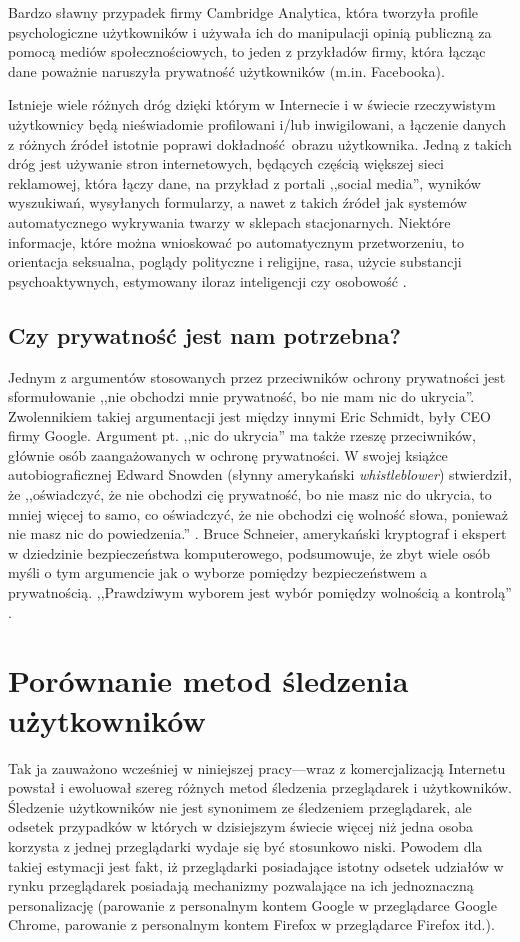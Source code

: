 Bardzo sławny przypadek firmy Cambridge Analytica, która tworzyła profile
psychologiczne użytkowników i używała ich do manipulacji opinią publiczną za
pomocą mediów społecznościowych, to jeden z przykładów firmy, która łącząc dane
poważnie naruszyła prywatność użytkowników (m.in. Facebooka).

Istnieje wiele różnych dróg dzięki którym w Internecie i w świecie rzeczywistym
użytkownicy będą nieświadomie profilowani i/lub inwigilowani, a łączenie danych
z różnych źródeł istotnie poprawi dokładność obrazu użytkownika. Jedną z takich
dróg jest używanie stron internetowych, będących częścią większej sieci
reklamowej, która łączy dane, na przykład z portali ,,social media'', wyników
wyszukiwań, wysyłanych formularzy, a nawet z takich źródeł jak systemów
automatycznego wykrywania twarzy w sklepach stacjonarnych. Niektóre informacje,
które można wnioskować po automatycznym przetworzeniu, to orientacja seksualna,
poglądy polityczne i religijne, rasa, użycie substancji psychoaktywnych,
estymowany iloraz inteligencji czy osobowość \cite{kosinski2013private}.

\subsection{Czy prywatność jest nam potrzebna?}
Jednym z argumentów stosowanych przez przeciwników ochrony prywatności jest
sformułowanie ,,nie obchodzi mnie prywatność, bo nie mam nic do ukrycia''.
Zwolennikiem takiej argumentacji jest między innymi Eric Schmidt, były CEO firmy
Google. Argument pt. ,,nic do ukrycia'' ma także rzeszę przeciwników, głównie
osób zaangażowanych w ochronę prywatności. W swojej książce autobiograficznej
Edward Snowden (słynny amerykański \emph{whistleblower}) stwierdził, że
,,oświadczyć, że nie obchodzi cię prywatność, bo nie masz nic do ukrycia, to
mniej więcej to samo, co oświadczyć, że nie obchodzi cię wolność słowa, ponieważ
nie masz nic do powiedzenia.'' \cite{snowden2019pamiec}. Bruce Schneier,
amerykański kryptograf i ekspert w dziedzinie bezpieczeństwa komputerowego,
podsumowuje, że zbyt wiele osób myśli o tym argumencie jak o wyborze pomiędzy
bezpieczeństwem a prywatnością. ,,Prawdziwym wyborem jest wybór pomiędzy
wolnością a kontrolą'' \cite{schneier2006eternal}.

\section{Porównanie metod śledzenia użytkowników}
Tak ja zauważono wcześniej w niniejszej pracy---wraz z komercjalizacją Internetu
powstał i ewoluował szereg różnych metod śledzenia przeglądarek i użytkowników.
Śledzenie użytkowników nie jest synonimem ze śledzeniem przeglądarek, ale
odsetek przypadków w których w dzisiejszym świecie więcej niż jedna osoba
korzysta z jednej przeglądarki wydaje się być stosunkowo niski. Powodem dla
takiej estymacji jest fakt, iż przeglądarki posiadające istotny odsetek udziałów
w rynku przeglądarek posiadają mechanizmy pozwalające na ich jednoznaczną
personalizację (parowanie z personalnym kontem Google w przeglądarce Google
Chrome, parowanie z personalnym kontem Firefox w przeglądarce Firefox itd.).

